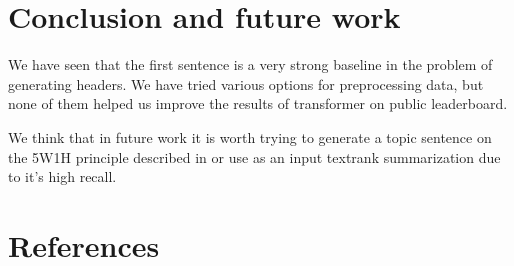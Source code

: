 \documentclass{dialogue}
\begin{document}
\section{Conclusion and future work}
We have seen that the first sentence is a very strong baseline in the problem of generating headers. We have tried various options for preprocessing data, but none of them helped us improve the results of transformer on public leaderboard.

We think that in future work it is worth trying to generate a topic sentence on the 5W1H principle described in \cite{Putra2018IncorporatingTS} or use as an input textrank summarization due to it's high recall.


\color{blue}\section*{References}

\makeatletter
\renewcommand{\section}{\@gobbletwo}
\makeatother

\end{document}
